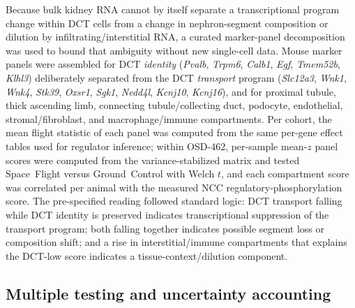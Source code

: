 \documentclass[11pt]{article}
\newcommand{\gene}[1]{\textit{#1}}
\begin{document}
Because bulk kidney RNA cannot by itself separate a transcriptional program change within DCT cells from a change in nephron-segment composition or dilution by infiltrating/interstitial RNA, a curated marker-panel decomposition was used to bound that ambiguity without new single-cell data. Mouse marker panels were assembled for DCT \emph{identity} (\gene{Pvalb}, \gene{Trpm6}, \gene{Calb1}, \gene{Egf}, \gene{Tmem52b}, \gene{Klhl3}) deliberately separated from the DCT \emph{transport} program (\gene{Slc12a3}, \gene{Wnk1}, \gene{Wnk4}, \gene{Stk39}, \gene{Oxsr1}, \gene{Sgk1}, \gene{Nedd4l}, \gene{Kcnj10}, \gene{Kcnj16}), and for proximal tubule, thick ascending limb, connecting tubule/collecting duct, podocyte, endothelial, stromal/fibroblast, and macrophage/immune compartments. Per cohort, the mean flight statistic of each panel was computed from the same per-gene effect tables used for regulator inference; within OSD-462, per-sample mean-$z$ panel scores were computed from the variance-stabilized matrix and tested Space~Flight versus Ground~Control with Welch $t$, and each compartment score was correlated per animal with the measured NCC regulatory-phosphorylation score. The pre-specified reading followed standard logic: DCT transport falling while DCT identity is preserved indicates transcriptional suppression of the transport program; both falling together indicates possible segment loss or composition shift; and a rise in interstitial/immune compartments that explains the DCT-low score indicates a tissue-context/dilution component.

\subsection{Multiple testing and uncertainty accounting}
\end{document}
